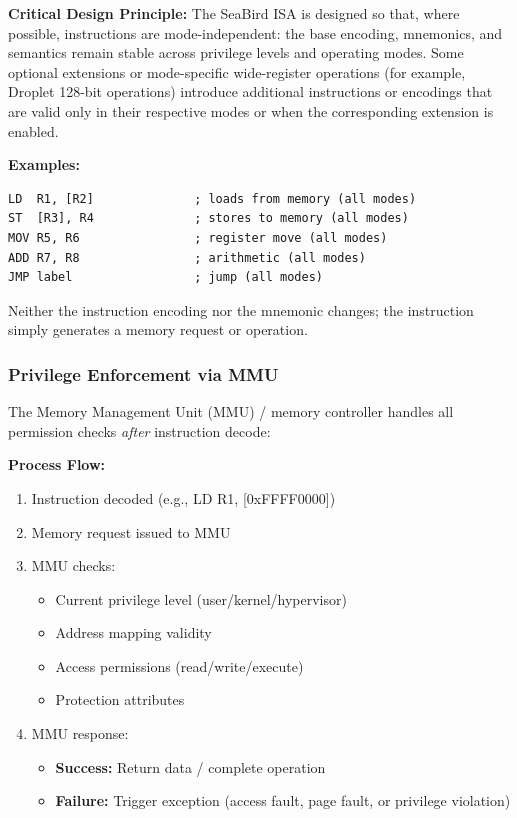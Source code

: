\documentclass[11pt]{article}
\begin{document}
\textbf{Critical Design Principle:} The SeaBird ISA is designed so that, where possible, instructions are mode-independent: the base encoding, mnemonics, and semantics remain stable across privilege levels and operating modes. Some optional extensions or mode-specific wide-register operations (for example, Droplet 128-bit operations) introduce additional instructions or encodings that are valid only in their respective modes or when the corresponding extension is enabled.

\textbf{Examples:}

\begin{lstlisting}
LD  R1, [R2]              ; loads from memory (all modes)
ST  [R3], R4              ; stores to memory (all modes)
MOV R5, R6                ; register move (all modes)
ADD R7, R8                ; arithmetic (all modes)
JMP label                 ; jump (all modes)
\end{lstlisting}

Neither the instruction encoding nor the mnemonic changes; the instruction simply generates a memory request or operation.

\subsubsection{Privilege Enforcement via MMU}

The Memory Management Unit (MMU) / memory controller handles all permission checks \textit{after} instruction decode:

\textbf{Process Flow:}

\begin{enumerate}
    \item Instruction decoded (e.g., LD R1, [0xFFFF0000])
    \item Memory request issued to MMU
    \item MMU checks:
    \begin{itemize}
        \item Current privilege level (user/kernel/hypervisor)
        \item Address mapping validity
        \item Access permissions (read/write/execute)
        \item Protection attributes
    \end{itemize}
    \item MMU response:
    \begin{itemize}
        \item \textbf{Success:} Return data / complete operation
        \item \textbf{Failure:} Trigger exception (access fault, page fault, or privilege violation)
    \end{itemize}
\end{enumerate}
\end{document}
